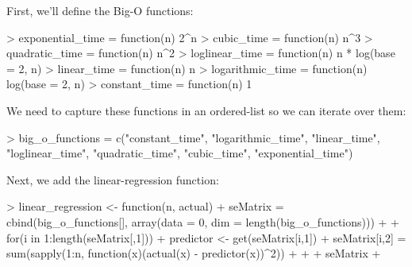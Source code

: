 \documentclass{article}
\begin{document}


First, we'll define the Big-O functions:
\begin{Schunk}
\begin{Sinput}
> exponential_time = function(n) {2^n}
> cubic_time = function(n) {n^3}
> quadratic_time = function(n) {n^2}
> loglinear_time = function(n) {n * log(base = 2, n)}
> linear_time = function(n) {n}
> logarithmic_time = function(n) {log(base = 2, n)}
> constant_time = function(n) {1}
\end{Sinput}
\end{Schunk}

We need to capture these functions in an ordered-list so we can iterate over them:
\begin{Schunk}
\begin{Sinput}
> big_o_functions = c("constant_time", "logarithmic_time", "linear_time", "loglinear_time", "quadratic_time", "cubic_time", "exponential_time")
\end{Sinput}
\end{Schunk}

Next, we add the linear-regression function:
\begin{Schunk}
\begin{Sinput}
> linear_regression <- function(n, actual) {
+   seMatrix = cbind(big_o_functions[], array(data = 0, dim = length(big_o_functions)))
+   
+   for(i in {1:length(seMatrix[,1])}) {
+     predictor <- get(seMatrix[i,1])
+     seMatrix[i,2] = sum(sapply({1:n}, function(x)(actual(x) - predictor(x))^2))
+   }
+   
+   seMatrix
+ }
\end{Sinput}
\end{Schunk}
\end{document}

